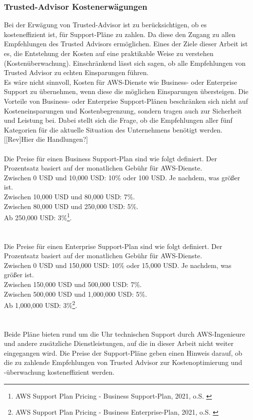 \subsubsection*{Trusted-Advisor Kostenerwägungen}
Bei der Erwägung von Trusted-Advisor ist zu berücksichtigen, ob es kosteneffizient ist, für Support-Pläne zu zahlen. Da diese den Zugang zu allen Empfehlungen des Trusted Advisors ermöglichen. Eines der Ziele dieser Arbeit ist es, die Entstehung der Kosten auf eine praktikable Weise zu verstehen (Kostenüberwachung). Einschränkend lässt sich sagen, ob alle Empfehlungen von Trusted Advisor zu echten Einsparungen führen.  %
\\
Es wäre nicht sinnvoll, Kosten für AWS-Dienste wie Business- oder Enterprise Support zu übernehmen, wenn diese die möglichen Einsparungen übersteigen. Die Vorteile von Business- oder Enterprise Support-Plänen beschränken sich nicht auf Kosteneinsparungen und Kostenbegrenzung, sondern tragen auch zur Sicherheit und Leistung bei. Dabei stellt sich die Frage, ob die Empfehlungen aller fünf Kategorien für die aktuelle Situation des Unternehmens benötigt werden.
[[Rev]Hier die Handlungen?]
\\\\   
Die Preise für einen Business Support-Plan sind wie folgt definiert. Der Prozentsatz basiert auf der monatlichen Gebühr für AWS-Dienste.
\\
Zwischen 0 USD und 10,000 USD: 10\% oder 100 USD. Je nachdem, was größer ist.\\
Zwischen 10,000 USD und 80,000 USD: 7\%.\\
Zwischen 80,000 USD und 250,000 USD: 5\%.\\
Ab 250,000 USD: 3\%\footnote{ AWS Support Plan Pricing - Business Support-Plan, 2021, o.S. \cite{AMZ38}}.\\
\\\\
Die Preise für einen Enterprise Support-Plan sind wie folgt definiert. Der Prozentsatz basiert auf der monatlichen Gebühr für AWS-Dienste.
\\
Zwischen 0 USD und 150,000 USD: 10\% oder 15,000 USD. Je nachdem, was größer ist.\\
Zwischen 150,000 USD und 500,000 USD: 7\%.\\
Zwischen 500,000 USD und 1,000,000 USD: 5\%.\\
Ab 1,000,000 USD: 3\%\footnote{ AWS Support Plan Pricing - Business Enterprise-Plan, 2021, o.S. \cite{AMZ38}}.\\
\\\\
Beide Pläne bieten rund um die Uhr technischen Support durch AWS-Ingenieure und andere zusätzliche Dienstleistungen, auf die in dieser Arbeit nicht weiter eingegangen wird. Die Preise der Support-Pläne geben einen Hinweis darauf, ob die zu zahlende Empfehlungen von Trusted Advisor zur Kostenoptimierung und -überwachung kosteneffizient werden.
